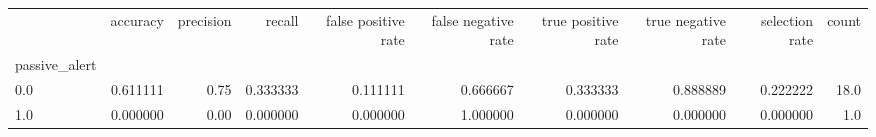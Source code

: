 \begin{tabular}{lrrrrrrrrr}
\toprule
{} &  accuracy &  precision &    recall &  false positive rate &  false negative rate &  true positive rate &  true negative rate &  selection rate &  count \\
passive\_alert &           &            &           &                      &                      &                     &                     &                 &        \\
\midrule
0.0           &  0.611111 &       0.75 &  0.333333 &             0.111111 &             0.666667 &            0.333333 &            0.888889 &        0.222222 &   18.0 \\
1.0           &  0.000000 &       0.00 &  0.000000 &             0.000000 &             1.000000 &            0.000000 &            0.000000 &        0.000000 &    1.0 \\
\bottomrule
\end{tabular}
